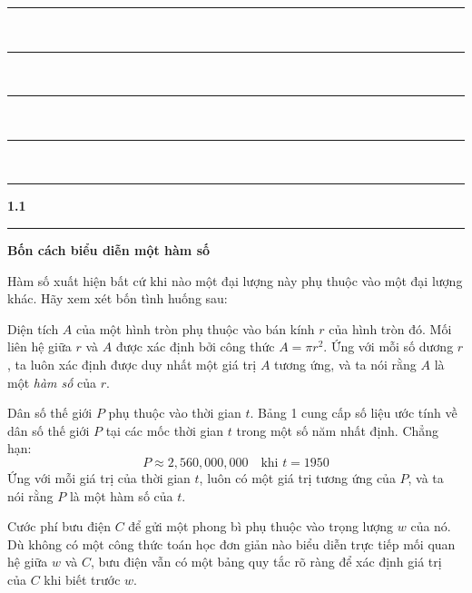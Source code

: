 \documentclass[10pt,letterpaper]{article}
\begin{document}
\begin{minipage}[t]{0.71\textwidth}
    \noindent
    \parbox[c]{1.5cm}{%
        \color{stewartcyan}%
        \rule{1.5cm}{0.6pt}\\[2.2pt]%
        \rule{1.5cm}{0.6pt}\\[2.2pt]%
        \rule{1.5cm}{0.6pt}\\[2.2pt]%
        \rule{1.5cm}{0.6pt}\\[2.2pt]%
        \rule{1.5cm}{0.6pt}%
    }%
    \hspace{0.25cm}%
    {\color{stewartcyan}\LARGE\textbf{\textsf{1.1}}}%
    \hspace{0.25cm}%
    {\color{stewartcyan}\rule[-0.2cm]{0.8pt}{0.85cm}}%
    \hspace{0.25cm}%
    {\LARGE\textbf{\textsf{Bốn cách biểu diễn một hàm số}}}
    
    \vspace{0.4cm}
    \vspace{0.18cm}

    Hàm số xuất hiện bất cứ khi nào một đại lượng này phụ thuộc vào một đại lượng khác. Hãy xem xét bốn tình huống sau:

    \begin{description}[leftmargin=1.5em, itemsep=1pt, topsep=2pt, partopsep=0pt, parsep=0pt]
        \item[\textbf{A.}] Diện tích $A$ của một hình tròn phụ thuộc vào bán kính $r$ của hình tròn đó. Mối liên hệ giữa $r$ và $A$ được xác định bởi công thức $A = \pi r^2$. Ứng với mỗi số dương $r$, ta luôn xác định được duy nhất một giá trị $A$ tương ứng, và ta nói rằng $A$ là một \textit{hàm số} của $r$.

        \item[\textbf{B.}] Dân số thế giới $P$ phụ thuộc vào thời gian $t$. Bảng 1 cung cấp số liệu ước tính về dân số thế giới $P$ tại các mốc thời gian $t$ trong một số năm nhất định. Chẳng hạn:
        \[
        P \approx 2{,}560{,}000{,}000 \quad \text{khi } t = 1950
        \]
        Ứng với mỗi giá trị của thời gian $t$, luôn có một giá trị tương ứng của $P$, và ta nói rằng $P$ là một hàm số của $t$.

        \item[\textbf{C.}] Cước phí bưu điện $C$ để gửi một phong bì phụ thuộc vào trọng lượng $w$ của nó. Dù không có một công thức toán học đơn giản nào biểu diễn trực tiếp mối quan hệ giữa $w$ và $C$, bưu điện vẫn có một bảng quy tắc rõ ràng để xác định giá trị của $C$ khi biết trước $w$.


\end{description}
\end{minipage}
\end{document}
